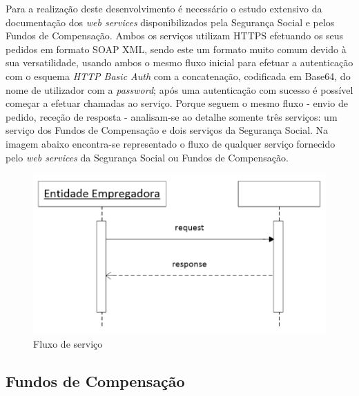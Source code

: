 \documentclass[sigplan]{acmart}
\begin{document}
Para a realização deste desenvolvimento é necessário o estudo extensivo da documentação dos \textit{web services} disponibilizados pela Segurança Social e pelos Fundos de Compensação. Ambos os serviços utilizam HTTPS efetuando os seus pedidos em formato SOAP XML, sendo este um formato muito comum devido à sua versatilidade, usando ambos o mesmo fluxo inicial para efetuar a autenticação com o esquema \textit{HTTP Basic Auth} com a concatenação, codificada em Base64, do nome de utilizador com a \textit{password}; após uma autenticação com sucesso é possível começar a efetuar chamadas ao serviço. Porque seguem o mesmo fluxo - envio de pedido, receção de resposta - analisam-se ao detalhe somente três serviços: um serviço dos Fundos de Compensação e dois serviços da Segurança Social. Na imagem abaixo encontra-se representado o fluxo de qualquer serviço fornecido pelo \textit{web services} da Segurança Social ou Fundos de Compensação.
\FloatBarrier
\begin{figure}[htbp]
	\centerline{\includegraphics[width=\linewidth]{figures/fluxo_servicos.png}}
	\caption{Fluxo de serviço}
	\label{fig3}
\end{figure}
\FloatBarrier

\subsection{Fundos de Compensação}
\end{document}
